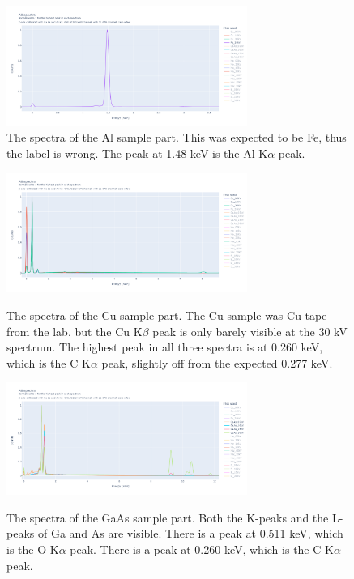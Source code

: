 
\begin{figure}
    \centering
    \includegraphics[width=0.70\textwidth]{figures/Spectra_Al.png}
    \caption{
        The spectra of the Al sample part.
        This was expected to be Fe, thus the label is wrong.
        The peak at 1.48 keV is the Al K$\alpha$ peak.
    }
    \label{fig:results:Spectra_Al}
\end{figure}

\begin{figure}
    \centering
    \includegraphics[width=0.70\textwidth]{figures/Spectra_Cu.png}
    \label{fig:Spectra_Cu}
    \caption{
        The spectra of the Cu sample part.
        The Cu sample was Cu-tape from the lab, but the Cu K$\beta$ peak is only barely visible at the 30 kV spectrum.
        The highest peak in all three spectra is at 0.260 keV, which is the C K$\alpha$ peak, slightly off from the expected 0.277 keV.
    }
\end{figure}

\begin{figure}
    \centering
    \includegraphics[width=0.70\textwidth]{figures/Spectra_GaAs.png}
    \label{fig:Spectra_GaAs}
    \caption{
        The spectra of the GaAs sample part.
        Both the K-peaks and the L-peaks of Ga and As are visible.
        There is a peak at 0.511 keV, which is the O K$\alpha$ peak.
        There is a peak at 0.260 keV, which is the C K$\alpha$ peak.
    }
\end{figure}

